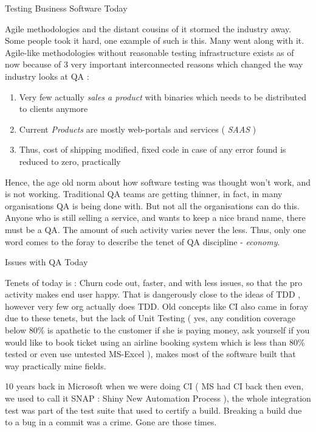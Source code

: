 \begin{section}{Testing Business Software Today}\label{practical-testing}

Agile methodologies and the distant cousins of it stormed the industry away. Some people took it hard, one example of such is this. Many went along with it. Agile-like methodologies without reasonable testing infrastructure exists as of now because of 3 very important interconnected reasons which changed the way industry looks at QA :

\begin{enumerate}
\item{ Very few actually \emph{sales a product} with binaries which needs to be distributed to clients anymore}
\item{ Current \emph{Products} are mostly web-portals and services ( \emph{SAAS} ) } 
\item{Thus, cost of shipping modified, fixed code in case of any error found is reduced to zero, practically}
\end{enumerate}


Hence, the age old norm about how software testing was thought won't work, and is not working. Traditional QA teams are getting thinner, in fact, in many organisations QA is being done with. But not all the organisations can do this. Anyone who is still selling a service, and wants to keep a nice brand name,  there must be a QA. The amount of such activity  varies never the less. Thus, only one word comes to the foray to describe the tenet of QA discipline  - \emph{economy}.

\begin{subsection}{Issues with QA Today}

Tenets of today is : Churn code out, faster, and with less issues, so that the pro activity makes end user happy. That is dangerously close to the ideas of  TDD , however very few org actually does TDD. Old concepts like CI  also came in foray due to these tenets, but the lack of Unit Testing ( yes, any condition coverage below 80\% is apathetic to the customer if she is paying money, ask yourself if you would like to book ticket using an airline booking system which is less than 80\% tested or even use untested MS-Excel ), makes most of the software built that way practically mine fields.

10 years back in Microsoft when we were doing CI ( MS had CI back then even, we used to call it SNAP : Shiny New Automation Process ), the whole integration test was part of the test suite that used to certify a build. Breaking a build due to a bug  in a commit was a crime. Gone are those times.


\end{subsection}
\end{section}
